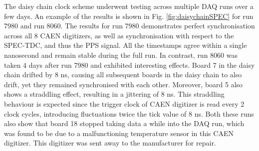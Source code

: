 The daisy chain clock scheme underwent testing across multiple DAQ runs over a few days. 
An example of the results is shown in Fig. \ref{fig:daisychainSPEC} for run 7980 and run 8060.
The results for run 7980 demonstrates perfect synchronisation across all 8 CAEN digitizers, as well as synchronisation with respect to the SPEC-TDC, and thus the PPS signal.
All the timestamps agree within a single nanosecond and remain stable during the full run.
In contrast, run 8060 was taken 4 days after run 7980 and exhibited interesting effects.
Board 7 in the daisy chain drifted by 8 ns, causing all subsequent boards in the daisy chain to also drift, yet they remained synchronised with each other. 
Moreover, board 5 also shows a straddling effect, resulting in a jittering of 8 ns.
This straddling behaviour is expected since the trigger clock of CAEN digitizer is read every 2 clock cycles, introducing fluctuations twice the tick value of 8 ns.
Both these runs also show that board 18 stopped taking data a while into the DAQ run, which was found to be due to a malfunctioning temperature sensor in this CAEN digitizer.
This digitizer was sent away to the manufacturer for repair.

